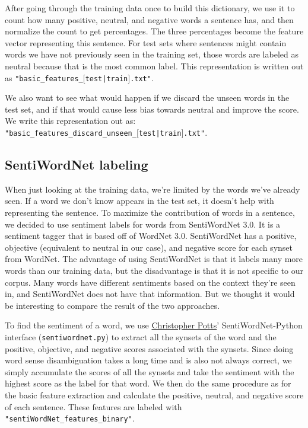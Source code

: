 \documentclass{article}
\begin{document}
After going through the training data once to build this dictionary, we use it to count how many positive, neutral, and negative words a sentence has, and then normalize the count to get percentages. The three percentages become the feature vector representing this sentence. For test sets where sentences might contain words we have not previously seen in the training set, those words are labeled as neutral because that is the most common label. This representation is written out as \texttt{"basic\_features\_$[$test|train$]$.txt"}. 

We also want to see what would happen if we discard the unseen words in the test set, and if that would cause less bias towards neutral and improve the score. We write this representation out as:\\
\texttt{"basic\_features\_discard\_unseen\_$[$test|train$]$.txt"}.

\subsection{SentiWordNet labeling}
When just looking at the training data, we're limited by the words we've already seen. If a word we don't know appears in the test set, it doesn't help with representing the sentence. To maximize the contribution of words in a sentence, we decided to use sentiment labels for words from SentiWordNet 3.0. It is a sentiment tagger that is based off of WordNet 3.0. SentiWordNet has a positive, objective (equivalent to neutral in our case), and negative score for each synset from WordNet. The advantage of using SentiWordNet is that it labels many more words than our training data, but the disadvantage is that it is not specific to our corpus. Many words have different sentiments based on the context they're seen in, and SentiWordNet does not have that information. But we thought it would be interesting to compare the result of the two approaches.

To find the sentiment of a word, we use \href{http://compprag.christopherpotts.net/wordnet.html}{Christopher Potts}' SentiWordNet-Python interface (\texttt{sentiwordnet.py}) to extract all the synsets of the word and the positive, objective, and negative scores associated with the synsets. Since doing word sense disambiguation takes a long time and is also not always correct, we simply accumulate the scores of all the synsets and take the sentiment with the highest score as the label for that word. We then do the same procedure as for the basic feature extraction and calculate the positive, neutral, and negative score of each sentence. These features are labeled with \texttt{"sentiWordNet\_features\_binary"}.
\end{document}
